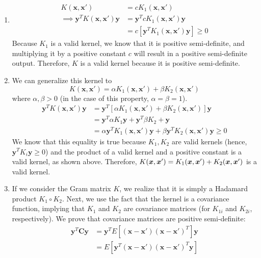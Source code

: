 \documentclass[submit]{harvardml}
\newcommand{\mbf}[1]{\mathbf{#1}}
\begin{document}
\begin{enumerate}
	\item 
		\begin{align*}
			K(\mathbf{x}, \mathbf{x'}) &= cK_1 (\mathbf{x},\mathbf{x'}) \\
			\implies \mathbf{y}^T K(\mathbf{x}, \mathbf{x'})\mathbf{y} &= \mathbf{y}^T cK_1 (\mathbf{x},
			\mathbf{x'}) \mathbf{y}\\ 
			&= c  \left[\mathbf{y}^T K_1 (\mathbf{x},\mathbf{x'}) \mathbf{y}\right] \geq 0 
		\end{align*}
		Because $K_1$ is a valid kernel, we know that it is positive semi-definite, and multiplying it by a 
		positive constant $c$ will result in a positive semi-definite output. Therefore, $K$ is a valid kernel 
		because it is positive semi-definite.
	\item We can generalize this kernel to 
			$$ K(\mbf{x}, \mbf{x'}) = \alpha K_1 (\mbf{x}, \mbf{x'}) + \beta K_2(\mbf{x}, \mbf{x'})$$
		where  $\alpha, \beta > 0$ (in the case of this property, $\alpha = \beta = 1$). 
		\begin{align*}
			\mbf{y}^TK(\mbf{x},\mbf{x'})\mbf{y} &= \mbf{y}^T \left[ \alpha K_1 (\mbf{x}, \mbf{x'}) + \beta 
			K_2(\mbf{x}, \mbf{x'}) \right] \mbf{y} \\ 
			&= \mbf{y}^T \alpha K_1 \mbf{y} + \mbf{y}^T \beta K_2 + \mbf{y} \\
			&= \alpha \mbf{y}^T K_1 (\mbf{x}, \mbf{x'}) \mbf{y} + \beta \mbf{y}^T K_2(\mbf{x}, \mbf{x'}) \mbf{y} \geq 0
		\end{align*}
		We know that this equality is true because $K_1, K_2$ are valid kernels (hence, $\mbf{y}^T K_i \mbf{y} \geq 0$)
		and the product of a valid kernel and a positive constant is a valid kernel, as shown above. Therefore, 
		$K(\boldsymbol{x}, \boldsymbol{x}') = K_1(\boldsymbol{x}, \boldsymbol{x}') + K_2(\boldsymbol{x}, \boldsymbol{x}')$ is a valid kernel.
	\item If we consider the Gram matrix $K$, we realize that it is simply a Hadamard product $K_1 \circ K_2$. Next, 
		we use the fact that the kernel is a covariance function, implying that $K_1$ and $K_2$ are covariance matrices 
		(for $K_{1i}$ and $K_{2i}$, respectively). We prove that covariance matrices are positive semi-definite:
		\begin{align*}
			\mbf{y}^T \mbf{C} \mbf{y} &= \mbf{y}^T E\left[(\mbf{x} - \mbf{x'})(\mbf{x} - \mbf{x'})^T  \right] \mbf{y} \\
			&= E\left [\mbf{y}^T (\mbf{x} - \mbf{x'})(\mbf{x} - \mbf{x'})^T \mbf{y}\right] \\

\end{align*}
\end{enumerate}
\end{document}
